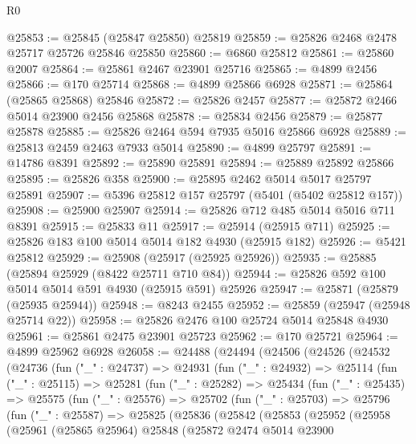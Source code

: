 \begin{lexlean}{R0}
\begin{coremodule}
@25853 := @25845 (@25847 @25850) @25819
@25859 := @25826 @2468 @2478 @25717 @25726 @25846 @25850
@25860 := @6860 @25812
@25861 := @25860 @2007
@25864 := @25861 @2467 @23901 @25716
@25865 := @4899 @2456
@25866 := @170 @25714
@25868 := @4899 @25866 @6928
@25871 := @25864 (@25865 @25868) @25846
@25872 := @25826 @2457
@25877 := @25872 @2466 @5014 @23900 @2456 @25868
@25878 := @25834 @2456
@25879 := @25877 @25878
@25885 := @25826 @2464 @594 @7935 @5016 @25866 @6928
@25889 := @25813 @2459 @2463 @7933 @5014
@25890 := @4899 @25797
@25891 := @14786 @8391
@25892 := @25890 @25891
@25894 := @25889 @25892 @25866
@25895 := @25826 @358
@25900 := @25895 @2462 @5014 @5017 @25797 @25891
@25907 := @5396 @25812 @157 @25797 (@5401 (@5402 @25812 @157))
@25908 := @25900 @25907
@25914 := @25826 @712 @485 @5014 @5016 @711 @8391
@25915 := @25833 @11
@25917 := @25914 (@25915 @711)
@25925 := @25826 @183 @100 @5014 @5014 @182 @4930 (@25915 @182)
@25926 := @5421 @25812
@25929 := @25908 (@25917 (@25925 @25926))
@25935 := @25885 (@25894 @25929 (@8422 @25711 @710 @84))
@25944 := @25826 @592 @100 @5014 @5014 @591 @4930 (@25915 @591) @25926
@25947 := @25871 (@25879 (@25935 @25944))
@25948 := @8243 @2455
@25952 := @25859 (@25947 (@25948 @25714 @22))
@25958 := @25826 @2476 @100 @25724 @5014 @25848 @4930
@25961 := @25861 @2475 @23901 @25723
@25962 := @170 @25721
@25964 := @4899 @25962 @6928
@26058 := @24488
    (@24494
      (@24506
        (@24526
          (@24532
            (@24736
              (fun ("_" : @24737) =>
              @24931
                (fun ("_" : @24932) =>
                @25114
                  (fun ("_" : @25115) =>
                  @25281
                    (fun ("_" : @25282) =>
                    @25434
                      (fun ("_" : @25435) =>
                      @25575
                        (fun ("_" : @25576) =>
                        @25702
                          (fun ("_" : @25703) =>
                          @25796
                            (fun ("_" : @25587) =>
                            @25825
                              (@25836
                                (@25842
                                  (@25853
                                    (@25952
                                      (@25958
                                        (@25961
                                          (@25865 @25964)
                                          @25848
                                          (@25872
                                            @2474
                                            @5014
                                            @23900

\end{coremodule}
\end{lexlean}
